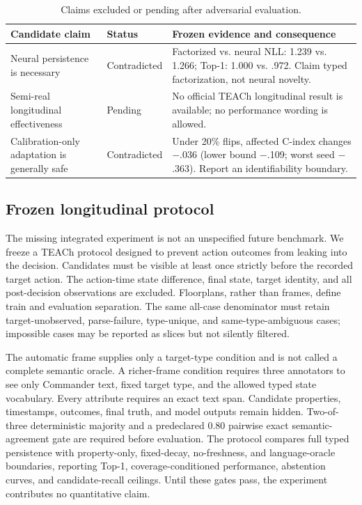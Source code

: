 \documentclass{article}
\begin{document}
\begin{table}[t]
\centering
\caption{Claims excluded or pending after adversarial evaluation.}
\label{tab:boundaries}
\small
\begin{tabular}{p{.24\linewidth}p{.15\linewidth}p{.45\linewidth}}
\toprule
Candidate claim & Status & Frozen evidence and consequence\\
\midrule
Neural persistence is necessary & Contradicted & Factorized vs. neural NLL: 1.239 vs. 1.266; Top-1: 1.000 vs. .972. Claim typed factorization, not neural novelty.\\
Semi-real longitudinal effectiveness & Pending & No official TEACh longitudinal result is available; no performance wording is allowed.\\
Calibration-only adaptation is generally safe & Contradicted & Under 20\% flips, affected C-index changes $-$.036 (lower bound $-$.109; worst seed $-$.363). Report an identifiability boundary.\\
\bottomrule
\end{tabular}
\end{table}

\subsection{Frozen longitudinal protocol}
The missing integrated experiment is not an unspecified future benchmark. We freeze a TEACh \citep{padmakumar2022teach} protocol designed to prevent action outcomes from leaking into the decision. Candidates must be visible at least once strictly before the recorded target action. The action-time state difference, final state, target identity, and all post-decision observations are excluded. Floorplans, rather than frames, define train and evaluation separation. The same all-case denominator must retain target-unobserved, parse-failure, type-unique, and same-type-ambiguous cases; impossible cases may be reported as slices but not silently filtered.

The automatic frame supplies only a target-type condition and is not called a complete semantic oracle. A richer-frame condition requires three annotators to see only Commander text, fixed target type, and the allowed typed state vocabulary. Every attribute requires an exact text span. Candidate properties, timestamps, outcomes, final truth, and model outputs remain hidden. Two-of-three deterministic majority and a predeclared 0.80 pairwise exact semantic-agreement gate are required before evaluation. The protocol compares full typed persistence with property-only, fixed-decay, no-freshness, and language-oracle boundaries, reporting Top-1, coverage-conditioned performance, abstention curves, and candidate-recall ceilings. Until these gates pass, the experiment contributes no quantitative claim.
\end{document}
